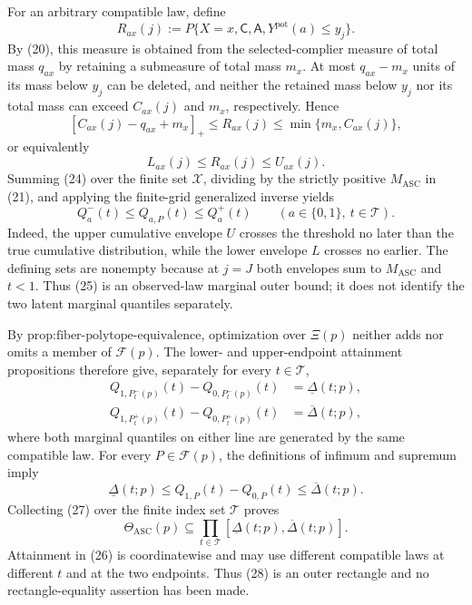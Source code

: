 For an arbitrary compatible law, define
\[
 R_{ax}(j)
 :=P\{X=x,\mathsf C,\mathsf A,
       Y^{\mathrm{pot}}(a)\leq y_j\}.
\tag{22}
\]
By (20), this measure is obtained from the selected-complier measure
of total mass \(q_{ax}\) by retaining a submeasure of total mass
\(m_x\).  At most \(q_{ax}-m_x\) units of its mass below \(y_j\) can
be deleted, and neither the retained mass below \(y_j\) nor its total
mass can exceed \(C_{ax}(j)\) and \(m_x\), respectively.  Hence
\[
 [C_{ax}(j)-q_{ax}+m_x]_+
 \leq R_{ax}(j)
 \leq\min\{m_x,C_{ax}(j)\},
\tag{23}
\]
or equivalently
\[
 L_{ax}(j)\leq R_{ax}(j)\leq U_{ax}(j).
\tag{24}
\]
Summing (24) over the finite set \(\mathcal X\), dividing by the
strictly positive \(M_{\mathrm{ASC}}\) in (21), and applying the
finite-grid generalized inverse yields
\[
 Q_a^-(t)\leq Q_{a,P}(t)\leq Q_a^+(t)
 \qquad(a\in\{0,1\},\ t\in\mathcal T).
\tag{25}
\]
Indeed, the upper cumulative envelope \(U\) crosses the threshold no
later than the true cumulative distribution, while the lower envelope
\(L\) crosses no earlier.  The defining sets are nonempty because at
\(j=J\) both envelopes sum to \(M_{\mathrm{ASC}}\) and \(t<1\).
Thus (25) is an observed-law marginal outer bound; it does not identify
the two latent marginal quantiles separately.

By \(\text{prop:fiber-polytope-equivalence}\), optimization over
\(\Xi(p)\) neither adds nor omits a member of \(\mathcal F(p)\).
The lower- and upper-endpoint attainment propositions therefore give,
separately for every \(t\in\mathcal T\),
\[
 \begin{aligned}
 Q_{1,P_t^-(p)}(t)-Q_{0,P_t^-(p)}(t)
 &=\underline\Delta(t;p),\\
 Q_{1,P_t^+(p)}(t)-Q_{0,P_t^+(p)}(t)
 &=\overline\Delta(t;p),
 \end{aligned}
\tag{26}
\]
where both marginal quantiles on either line are generated by the same
compatible law.  For every \(P\in\mathcal F(p)\), the definitions of
infimum and supremum imply
\[
 \underline\Delta(t;p)
 \leq Q_{1,P}(t)-Q_{0,P}(t)
 \leq\overline\Delta(t;p).
\tag{27}
\]
Collecting (27) over the finite index set \(\mathcal T\) proves
\[
 \Theta_{\mathrm{ASC}}(p)
 \subseteq
 \prod_{t\in\mathcal T}
 [\underline\Delta(t;p),\overline\Delta(t;p)].
\tag{28}
\]
Attainment in (26) is coordinatewise and may use different compatible
laws at different \(t\) and at the two endpoints.  Thus (28) is an
outer rectangle and no rectangle-equality assertion has been made.

